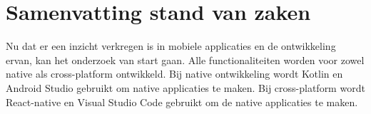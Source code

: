 \section{Samenvatting stand van zaken}
Nu dat er een inzicht verkregen is in mobiele applicaties en de ontwikkeling ervan, 
kan het onderzoek van start gaan. Alle functionaliteiten worden voor 
zowel native als cross-platform ontwikkeld. Bij native ontwikkeling wordt 
Kotlin en Android Studio gebruikt om native applicaties te maken. 
Bij cross-platform wordt React-native en Visual Studio Code gebruikt om de 
native applicaties te maken.














